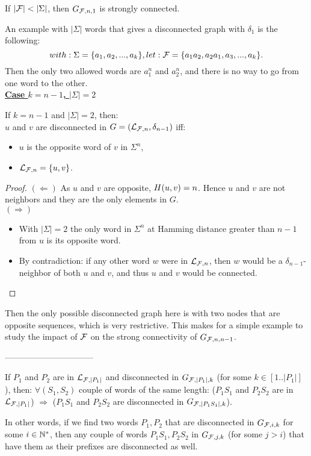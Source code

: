 \documentclass{article}
\begin{document}
\begin{corollary}
	If $|\mathcal{F}| < |\Sigma|$, then $G_{\mathcal{F}, n, 1}$ is strongly connected.
\end{corollary}
\noindent
An example with $|\Sigma|$ words that gives a disconnected graph with $\delta_1$ is the following:
$$with: \Sigma = \{a_1, a_2,...,a_k\}, let: \mathcal{F} = \{a_1 a_2, a_2 a_1, a_3,...,a_k\}.$$
Then the only two allowed words are $a_1^n$ and $a_2^n$, and there is no way to go from one word to the other. \\

\noindent
\underline{\textbf{Case $k = n-1$, $|\Sigma| = 2$}} \\

\begin{result}
	If $k = n-1$ and $|\Sigma| = 2$, then: \\
	$u$ and $v$ are disconnected in $G = (\mathcal{L}_{\mathcal{F}, n}, \delta_{n-1})$ iff:
	\begin{itemize}
		\item $u$ is the opposite word of $v$ in $\Sigma^n$,
		\item $\mathcal{L}_{\mathcal{F}, n} = \{u,v\}$.
	\end{itemize}
\end{result}
\begin{proof}

	$(\Leftarrow)$ As $u$ and $v$ are opposite, $H(u,v) = n$. Hence $u$ and $v$ are not neighbors and they are the only elements in $G$. \\
	
	$(\Rightarrow)$
	\begin{itemize}
		\item With $|\Sigma| = 2$ the only word in $\Sigma^n$ at Hamming distance greater than $n-1$ from $u$ is its opposite word.
		\item By contradiction: if any other word $w$ were in $\mathcal{L}_{\mathcal{F}, n}$, then $w$ would be a $\delta_{n-1}$-neighbor of both $u$ and $v$, and thus $u$ and $v$ would be connected.
	\end{itemize}
\end{proof}

Then the only possible disconnected graph here is with two nodes that are opposite sequences, which is very restrictive. This makes for a simple example to study the impact of $\mathcal{F}$ on the strong connectivity of $G_{\mathcal{F}, n, n-1}$.

\noindent
--------------------------------

\begin{proposition}
	If $P_1$ and $P_2$ are in $\mathcal{L}_{\mathcal{F}, |P_1|}$ and disconnected in $G_{\mathcal{F}, |P_1|, k}$ (for some $k \in [1..|P_1|]$), then:
	$\forall (S_1, S_2)$ couple of words of the same length: ($P_1 S_1$ and $P_2 S_2$ are in $\mathcal{L}_{\mathcal{F}, |P_1|}$) $\Rightarrow$ ($P_1 S_1$ and $P_2 S_2$ are disconnected in $G_{\mathcal{F}, |P_1 S_1|, k}$).
\end{proposition}
\noindent
In other words, if we find two words $P_1, P_2$ that are disconnected in $G_{\mathcal{F}, i, k}$ for some $i \in \mathbb{N}^*$, then any couple of words $P_1 S_1, P_2 S_2$ in $G_{\mathcal{F}, j, k}$ (for some $j > i$) that have them as their prefixes are disconnected as well.
\end{document}
